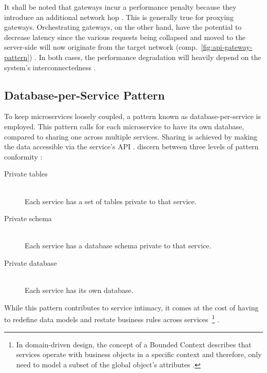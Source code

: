 \FloatBarrier

It shall be noted that gateways incur a performance penalty because they introduce an additional network hop \cite[p.~37]{messina2016simplified}. This is generally true for proxying gateways. Orchestrating gateways, on the other hand, have the potential to decrease latency since the various requests being collapsed and moved to the server-side will now originate from the target network (comp.~\autoref{fig:api-gateway-pattern}) \cite{netflix2013api}. In both cases, the performance degradation will heavily depend on the system's interconnectedness \cite[p.~9]{dragoni2017microservices}.


\subsection{Database-per-Service Pattern}
\label{sec:database-per-service-pattern}

To keep microservices loosely coupled, a pattern known as database-per-service is employed. This pattern calls for each microservice to have its own database, compared to sharing one across multiple services. Sharing is achieved by making the data accessible via the service's \acs{API} \cite[p.~36]{messina2016simplified} \cite[p.~59]{taibi2018definition}. \citeauthor{messina2016simplified} discern between three levels of pattern conformity \cite[p.~37]{messina2016simplified}:

\begin{description}
  \item[Private tables]
  \hfill \\
  Each service has a set of tables private to that service.

  \item[Private schema]
  \hfill \\
  Each service has a database schema private to that service.

  \item[Private database]
  \hfill \\
  Each service has its own database.
\end{description}

While this pattern contributes to service intimacy, it comes at the cost of having to redefine data models and restate business rules across services~\footnote{In domain-driven design, the concept of a Bounded Context describes that services operate with business objects in a specific context and therefore, only need to model a subset of the global object's attributes \cite[p.~30]{cerny2018contextual}.} \cite[p.~30]{cerny2018contextual}.


